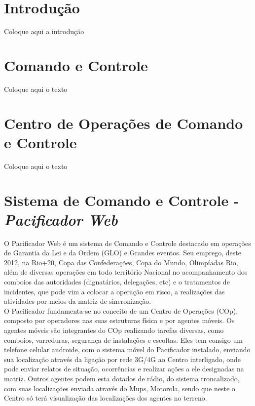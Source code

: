 \maketitle
\begin{abstract}
\noindent 

\end{abstract}

\section*{Introdução}
\hspace{1.5cm}
Coloque aqui a introdução\\


\section*{Comando e Controle}
\hspace{1.5cm}
Coloque aqui o texto\\


\section*{Centro de Operações de Comando e Controle}
\hspace{1.5cm}
Coloque aqui o texto\\


\section*{Sistema de Comando e Controle - \textbf{\textit{Pacificador Web}}}
\hspace{1.5cm}
O Pacificador Web é um sistema de Comando e Controle destacado em operações de Garantia da Lei e da Ordem (GLO) e Grandes eventos. Seu emprego, deste 2012, na Rio+20, Copa das Confederações, Copa do Mundo, Olimpíadas Rio, além de diversas operações em todo território Nacional no acompanhamento dos comboios das autoridades (dignatários, delegações, etc) e o tratamentos de incidentes, que pode vim a colocar a operação em risco, a realizações das atividades por meios da matriz de sincronização.\\

\hspace{1.5cm}
O Pacificador fundamenta-se no conceito de um Centro de Operações (COp), composto por operadores nas suas estruturas física e por agentes móveis. Os agentes móveis são integrantes do COp realizando tarefas diversas, como comboios, varreduras, segurança de instalações e escoltas. Eles tem consigo um telefone celular androide, com o sistema móvel do Pacificador instalado,  enviando sua localização através da ligação por rede 3G/4G ao Centro interligado, onde pode enviar relatos de situação, ocorrências e realizar ações a ele designadas na matriz. Outros agentes podem esta dotados de rádio, do sistema troncalizado, com suas localizações enviada através do Mups, Motorola, sendo que neste o Centro só terá visualização das localizações dos agentes no terreno. \\

